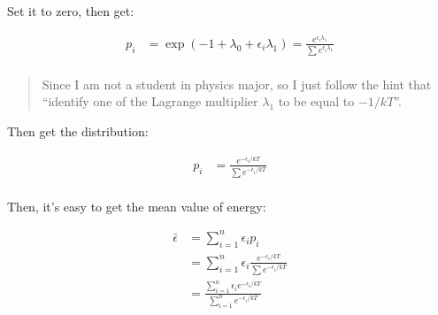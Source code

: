 Set it to zero, then get:

\[
\begin{aligned}
p_i&=\exp(-1+\lambda_0+\epsilon_i\lambda_1)=\frac{e^{\epsilon_i\lambda_1}}{\sum e^{\epsilon_i\lambda_1}}\\
\end{aligned}
\]

\begin{quote}
Since I am not a student in physics major, so I just follow the hint
that ``identify one of the Lagrange multiplier \(\lambda_1\) to be equal
to \(-1/kT\)''.
\end{quote}

Then get the distribution:

\[
\begin{aligned}
p_i&=\frac{e^{-\epsilon_i/kT}}{\sum e^{-\epsilon_i/kT}}\\
\end{aligned}
\]

Then, it's easy to get the mean value of energy:

\[
\begin{aligned}
\bar\epsilon&=\sum_{i=1}^n\epsilon_ip_i\\
&=\sum_{i=1}^n\epsilon_i\frac{e^{-\epsilon_i/kT}}{\sum e^{-\epsilon_i/kT}}\\
&=\frac{\sum_{i=1}^n\epsilon_ie^{-\epsilon_i/kT}}{\sum_{i=1}^n e^{-\epsilon_i/kT}}\\
\end{aligned}
\]
